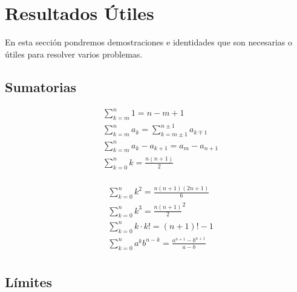 \section{Resultados Útiles}

En esta sección pondremos demostraciones e identidades que son necesarias o útiles para resolver varios problemas.

\subsection{Sumatorias}

\begin{minipage}{0.55\textwidth}
\begin{equation}
\begin{split}
    &\sum^{n}_{k=m} 1 = n - m + 1\\
    &\sum^{n}_{k=m} a_{k} = \sum^{n\pm 1}_{k=m\pm 1} a_{k\mp 1}\\
    &\sum^{n}_{k=m} a_{k} - a_{k+1} = a_{m} - a_{n+1}\\
    &\sum^{n}_{k=0} k = \frac{n(n+1)}{2}\\
\end{split}
\nonumber
\end{equation}
\end{minipage}
\begin{minipage}{0.55\textwidth}
\begin{equation}
\begin{split}
    &\sum^{n}_{k=0} k^{2} = \frac{n(n+1)(2n+1)}{6}\\
    &\sum^{n}_{k=0} k^{3} = {\frac{n(n+1)}{2}}^{2}\\
    &\sum^{n}_{k=0} k\cdot k! = (n+1)! - 1\\
    &\sum^{n}_{k=0} a^{k}b^{n-k} = \frac{a^{n+1}-b^{n+1}}{a-b}\\
\end{split}
\nonumber
\end{equation}
\end{minipage}

\subsection{Límites}

